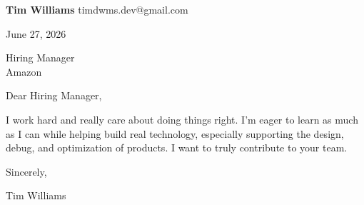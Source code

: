 \documentclass[12pt]{article}
\begin{document}
\textbf{Tim Williams} \hfill timdwms.dev@gmail.com

\vspace{1em}

June 27, 2026

\vspace{1em}

Hiring Manager \\
Amazon

\vspace{1em}

Dear Hiring Manager,

I work hard and really care about doing things right. I’m eager to learn as much as I can while helping build real technology, especially supporting the design, debug, and optimization of products. I want to truly contribute to your team.

\vspace{1em}

Sincerely,

\vspace{2em}

Tim Williams
\end{document}

